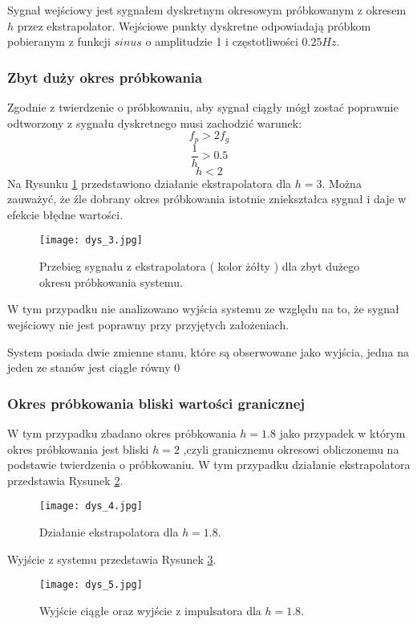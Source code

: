 \documentclass[a4paper,11pt]{article}
\begin{document}
Sygnał wejściowy jest sygnałem dyskretnym okresowym próbkowanym z okresem \( h \) przez ekstrapolator. Wejściowe punkty dyskretne odpowiadają próbkom pobieranym z funkcji \( sinus \) o amplitudzie 1 i częstotliwości \( 0.25 Hz \). 

\subsubsection{Zbyt duży okres próbkowania}
Zgodnie z twierdzenie o próbkowaniu, aby sygnał ciągły mógł zostać poprawnie odtworzony z sygnału dyskretnego musi zachodzić warunek:
\begin{equation*}
f_{p} > 2f_{g} 
\end{equation*}
\begin{equation*}
\frac{1}{h} > 0.5 
\end{equation*}
\begin{equation*}
h < 2
\end{equation*}
Na Rysunku \ref{fig:dys_3} przedstawiono działanie ekstrapolatora dla \( h = 3 \). Można zauważyć, że źle dobrany okres próbkowania istotnie zniekształca sygnał i daje w efekcie błędne wartości.
\begin{figure}[H]
\centerline{\texttt{[image: dys\_3.jpg]}}
\caption{Przebieg sygnału z ekstrapolatora ( kolor żółty ) dla zbyt dużego okresu próbkowania systemu.}
\label{fig:dys_3}
\end{figure}
W tym przypadku nie analizowano wyjścia systemu ze względu na to, że sygnał wejściowy nie jest poprawny przy przyjętych założeniach. 

System posiada dwie zmienne stanu, które są obserwowane jako wyjścia, jedna na jeden ze stanów jest ciągle równy 0
\subsubsection{Okres próbkowania bliski wartości granicznej}
W tym przypadku zbadano okres próbkowania \( h = 1.8 \) jako przypadek w którym okres próbkowania jest bliski \( h = 2 \) ,czyli granicznemu okresowi obliczonemu na podstawie twierdzenia o próbkowaniu. W tym przypadku działanie ekstrapolatora przedstawia Rysunek \ref{fig:dys_4}.

\begin{figure}[H]
\centerline{\texttt{[image: dys\_4.jpg]}}
\caption{Działanie ekstrapolatora dla \( h = 1.8 \).}
\label{fig:dys_4}
\end{figure}

Wyjście z systemu przedstawia Rysunek \ref{fig:dys_5}. 
\begin{figure}[H]
\centerline{\texttt{[image: dys\_5.jpg]}}
\caption{Wyjście ciągłe oraz wyjście z impulsatora dla \( h = 1.8 \).}
\label{fig:dys_5}
\end{figure}
\end{document}
